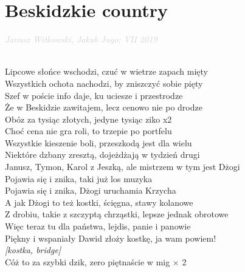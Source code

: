 \documentclass[a5paper, 10pt]{book}
\begin{document}
\section{Beskidzkie country}\textcolor{lightgray}{\textit{Janusz Witkowski, Jakub Jugo; VII 2019}}\\~\\
\begin{minipage}[t]{0.8\textwidth}
  Lipcowe słońce wschodzi, czuć w wietrze zapach mięty\\
  Wszystkich ochota nachodzi, by zniszczyć sobie pięty \\
  Szef w poście info daje, ku uciesze i przestrodze\\
  Że w Beskidzie zawitajem, lecz cenowo nie po drodze\vspace*{2mm}
  \\
  \hspace*{5mm}Obóz za tysiąc złotych, jedyne tysiąc ziko x2\vspace*{2mm}
  \\
  Choć cena nie gra roli, to trzepie po portfelu\\
  Wszystkie kieszenie boli, przeszkodą jest dla wielu \\
  Niektóre dzbany zresztą, dojeżdżają w tydzień drugi\\
  Janusz, Tymon, Karol z Jeszką, ale mistrzem w tym jest Dżogi \vspace*{2mm}
  \\
  \hspace*{5mm}Pojawia się i znika, taki już los muzyka\\
  \hspace*{5mm}Pojawia się i znika, Dżogi uruchamia Krzycha\vspace*{2mm}
  \\
  A jak Dżogi to też kostki, ścięgna, stawy kolanowe\\
  Z drobiu, takie z szczyptą chrząstki, lepsze jednak obrotowe \\
  Więc teraz tu dla państwa, lejdis, panie i panowie\\
  Piękny i wspaniały Dawid złoży kostkę, ja wam powiem! \vspace*{2mm}
  \\
  {\small \textit{[kostka, bridge]}}\vspace*{2mm}
  \\
  \hspace*{5mm}Cóż to za szybki dzik, zero piętnaście w mig $\times$ 2\vspace*{2mm}
  \\

\end{minipage}
\end{document}
